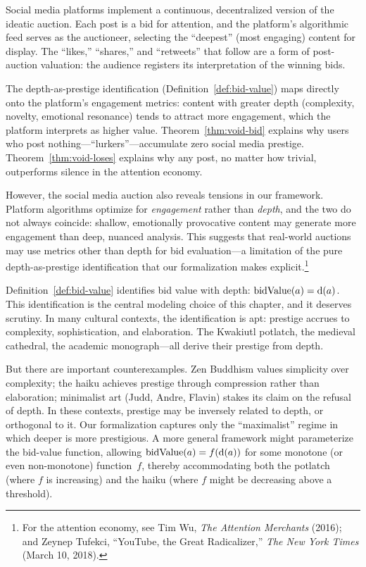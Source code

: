 \begin{example}
\label{ex:social-media}
Social media platforms implement a continuous, decentralized version of
the ideatic auction.  Each post is a bid for attention, and the
platform's algorithmic feed serves as the auctioneer, selecting the
``deepest'' (most engaging) content for display.  The ``likes,''
``shares,'' and ``retweets'' that follow are a form of post-auction
valuation: the audience registers its interpretation of the winning bids.

The depth-as-prestige identification
(Definition~\ref{def:bid-value}) maps directly onto the platform's
engagement metrics: content with greater depth (complexity, novelty,
emotional resonance) tends to attract more engagement, which the
platform interprets as higher value.  Theorem~\ref{thm:void-bid}
explains why users who post nothing---``lurkers''---accumulate zero social
media prestige.  Theorem~\ref{thm:void-loses} explains why any post, no
matter how trivial, outperforms silence in the attention economy.

However, the social media auction also reveals tensions in our framework.
Platform algorithms optimize for \emph{engagement} rather than
\emph{depth}, and the two do not always coincide: shallow, emotionally
provocative content may generate more engagement than deep, nuanced
analysis.  This suggests that real-world auctions may use metrics other
than depth for bid evaluation---a limitation of the pure depth-as-prestige
identification that our formalization makes explicit.\footnote{For the
attention economy, see Tim Wu, \textit{The Attention Merchants} (2016);
and Zeynep Tufekci, ``YouTube, the Great Radicalizer,'' \textit{The New
York Times} (March 10, 2018).}
\end{example}

\begin{remark}
\label{rem:depth-prestige}
Definition~\ref{def:bid-value} identifies bid value with depth:
$\operatorname{bidValue}(a) = \operatorname{d}(a)$.  This identification is the
central modeling choice of this chapter, and it deserves scrutiny.  In
many cultural contexts, the identification is apt: prestige accrues to
complexity, sophistication, and elaboration.  The Kwakiutl potlatch,
the medieval cathedral, the academic monograph---all derive their
prestige from depth.

But there are important counterexamples.  Zen Buddhism values simplicity
over complexity; the haiku achieves prestige through compression rather
than elaboration; minimalist art (Judd, Andre, Flavin) stakes its claim
on the refusal of depth.  In these contexts, prestige may be inversely
related to depth, or orthogonal to it.  Our formalization captures only
the ``maximalist'' regime in which deeper is more prestigious.  A more
general framework might parameterize the bid-value function, allowing
$\operatorname{bidValue}(a) = f(\operatorname{d}(a))$ for some monotone (or even
non-monotone) function~$f$, thereby accommodating both the potlatch
(where $f$ is increasing) and the haiku (where $f$ might be decreasing
above a threshold).
\end{remark}

